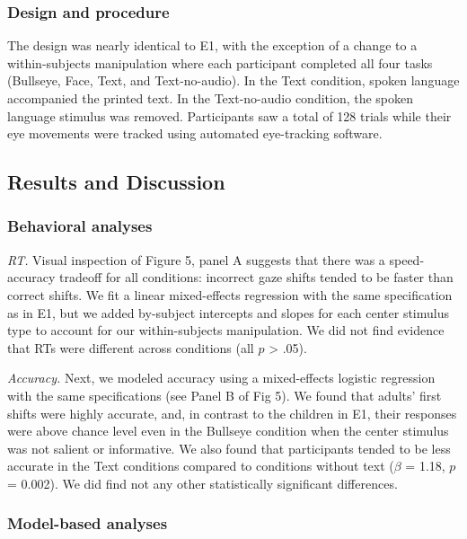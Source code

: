 \documentclass[10pt, letterpaper]{article}
\begin{document}
\subsubsection{Design and procedure}\label{design-and-procedure-1}

The design was nearly identical to E1, with the exception of a change to
a within-subjects manipulation where each participant completed all four
tasks (Bullseye, Face, Text, and Text-no-audio). In the Text condition,
spoken language accompanied the printed text. In the Text-no-audio
condition, the spoken language stimulus was removed. Participants saw a
total of 128 trials while their eye movements were tracked using
automated eye-tracking software.

\subsection{Results and Discussion}\label{results-and-discussion-1}

\subsubsection{Behavioral analyses}\label{behavioral-analyses-1}

\emph{RT.} Visual inspection of Figure 5, panel A suggests that there
was a speed-accuracy tradeoff for all conditions: incorrect gaze shifts
tended to be faster than correct shifts. We fit a linear mixed-effects
regression with the same specification as in E1, but we added by-subject
intercepts and slopes for each center stimulus type to account for our
within-subjects manipulation. We did not find evidence that RTs were
different across conditions (all \(p\) \textgreater{} .05).

\emph{Accuracy.} Next, we modeled accuracy using a mixed-effects
logistic regression with the same specifications (see Panel B of Fig 5).
We found that adults' first shifts were highly accurate, and, in
contrast to the children in E1, their responses were above chance level
even in the Bullseye condition when the center stimulus was not salient
or informative. We also found that participants tended to be less
accurate in the Text conditions compared to conditions without text
(\(\beta\) = 1.18, \(p\) = 0.002). We did find not any other
statistically significant differences.

\subsubsection{Model-based analyses}\label{model-based-analyses-1}
\end{document}
